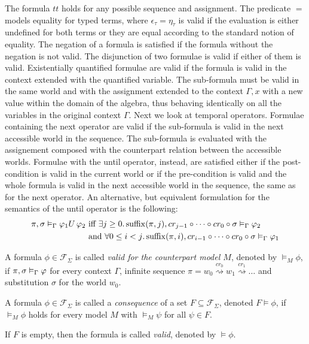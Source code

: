 The formula $tt$ holds for any possible sequence and assignment. The predicate $=$ models equality for typed terms, where
$\epsilon_\tau = \eta_\tau$ is valid if the evaluation is either undefined for both terms or they are equal according to
the standard notion of equality. The negation of a formula is satisfied if the formula without the negation is not
valid. The disjunction of two formulae is valid if either of them is valid. Existentially quantified formulae are valid
if the formula is valid in the context extended with the quantified variable. The sub-formula must be valid in the same
world and with the assignment extended to the context $\Gamma, x$ with a new value within the domain of the algebra,
thus behaving identically on all the variables in the original context $\Gamma$. Next we look at temporal operators.
Formulae containing the next operator are valid if the sub-formula is valid in the next accessible world in the sequence.
The sub-formula is evaluated with the assignement composed with the counterpart relation between the accessible worlds.
Formulae with the until operator, instead, are satisfied either if the post-condition is valid in the current world or 
if the pre-condition is valid and the whole formula is valid in the next accessible world in the sequence, the same as
for the next operator. An alternative, but equivalent formulation for the semantics of the until operator is the following:
\begin{align*}
  \pi, \sigma \vDash_\Gamma {\varphi_1}U\,{\varphi_2}
      &\text{ iff } \exists {j \geq 0} \ldotp {{\operatorname{suffix}(\pi,j)}, {cr_{j-1} \circ \cdots \circ cr_0 \circ \sigma} \vDash_{\Gamma} {\varphi_2}} \\
      &\text{ and } \forall {0 \leq i < j} \ldotp {{\operatorname{suffix}(\pi,i)}, {cr_{i-1} \circ \cdots \circ cr_0 \circ \sigma} \vDash_{\Gamma} {\varphi_1}}
\end{align*}

\begin{definition}\label{eq:validmodel}
  A formula $\phi \in \mathcal{F}_\Sigma$ is called \emph{valid for the counterpart model $M$}, denoted by $\vDash_M
  \phi$, if ${\pi}, {\sigma} \vDash_{\Gamma} {\varphi}$ for every context $\Gamma$, infinite sequence $\pi = w_0 \overset{cr_0}{\rightsquigarrow} w_1 \overset{cr_1}{\rightsquigarrow} \ldots$ and substitution $\sigma$ for the world $w_0$.
\end{definition}
\begin{definition}\label{eq:valid}
  A formula $\phi \in \mathcal{F}_\Sigma$ is called a \emph{consequence} of a set $F \subseteq \mathcal{F}_\Sigma$,
  denoted $F \vDash \phi$, if $\vDash_M \phi$ holds for every model $M$ with $\vDash_M \psi$ for all $\psi \in F$.

  If $F$ is empty, then the formula is called \emph{valid}, denoted by $\vDash \phi$.
\end{definition}

